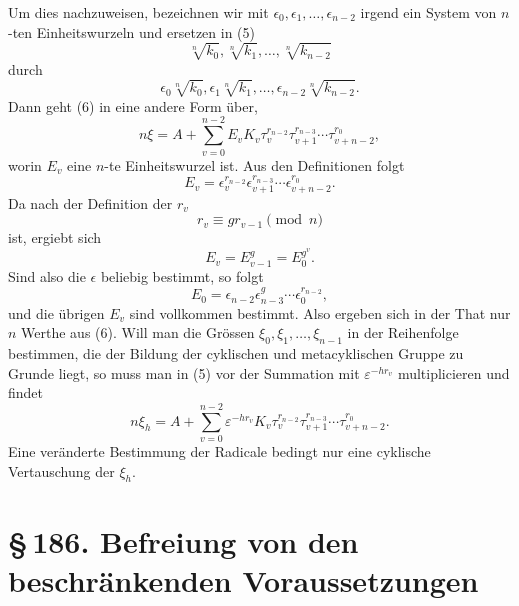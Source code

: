 \documentclass[11pt]{article}
\providecommand{\sect}[2]{\section*{\S\,#1. #2}}
\begin{document}
Um dies nachzuweisen, bezeichnen wir mit $\epsilon_0,\epsilon_1,\ldots,\epsilon_{n-2}$ irgend ein System von $n$-ten Einheitswurzeln und ersetzen in (5)
\[
  \sqrt[n]{k_0},\sqrt[n]{k_1},\ldots,\sqrt[n]{k_{n-2}}
\]
durch
\[
  \epsilon_0\sqrt[n]{k_0},\epsilon_1\sqrt[n]{k_1},\ldots,
  \epsilon_{n-2}\sqrt[n]{k_{n-2}}.
\]
Dann geht (6) in eine andere Form \"uber,
\begin{equation}\tag{9}
  n\xi=A+
  \sum_{v=0}^{n-2}E_vK_v\tau_v^{r_{n-2}}\tau_{v+1}^{r_{n-3}}\cdots\tau_{v+n-2}^{r_0},
\end{equation}
worin $E_v$ eine $n$-te Einheitswurzel ist. Aus den Definitionen folgt
\begin{equation}\tag{10}
  E_v=\epsilon_v^{r_{n-2}}\epsilon_{v+1}^{r_{n-3}}\cdots\epsilon_{v+n-2}^{r_0}.
\end{equation}
Da nach der Definition der $r_v$
\begin{equation}\tag{11}
  r_v\equiv gr_{v-1}\pmod n
\end{equation}
ist, ergiebt sich
\begin{equation}\tag{12}
  E_v=E_{v-1}^{g}=E_0^{g^v}.
\end{equation}
Sind also die $\epsilon$ beliebig bestimmt, so folgt
\begin{equation}\tag{13}
  E_0=\epsilon_{n-2}\epsilon_{n-3}^{g}\cdots \epsilon_0^{r_{n-2}},
\end{equation}
und die \"ubrigen $E_v$ sind vollkommen bestimmt. Also ergeben sich in der That nur $n$ Werthe aus (6). Will man die Gr\"ossen $\xi_0,\xi_1,\ldots,\xi_{n-1}$ in der Reihenfolge bestimmen, die der Bildung der cyklischen und metacyklischen Gruppe zu Grunde liegt, so muss man in (5) vor der Summation mit $\varepsilon^{-hr_v}$ multiplicieren und findet
\begin{equation}\tag{14}
  n\xi_h=A+
  \sum_{v=0}^{n-2}\varepsilon^{-hr_v}K_v\tau_v^{r_{n-2}}\tau_{v+1}^{r_{n-3}}\cdots\tau_{v+n-2}^{r_0}.
\end{equation}
Eine ver\"anderte Bestimmung der Radicale bedingt nur eine cyklische Vertauschung der $\xi_h$.

\sect{186}{Befreiung von den beschr\"ankenden Voraussetzungen}
\end{document}
